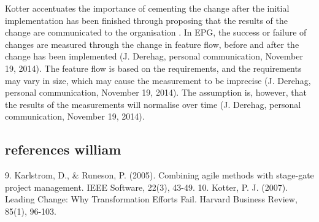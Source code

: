 \documentclass[final_report_innit.tex]{subfiles}
\begin{document}
Kotter accentuates the importance of cementing the change after the initial implementation has been finished through proposing that the results of the change are communicated to the organisation \cite{kotter1995leading}. In EPG, the success or failure of changes are measured through the change in feature flow, before and after the change has been implemented (J. Derehag, personal communication, November 19, 2014). The feature flow is based on the requirements, and the requirements may vary in size, which may cause the measurement to be imprecise (J. Derehag, personal communication, November 19, 2014). The assumption is, however, that the results of the measurements will normalise over time (J. Derehag, personal communication, November 19, 2014).   


\subsection*{references william}



9. Karlstrom, D., \& Runeson, P. (2005). Combining agile methods with stage-gate project management. IEEE Software, 22(3), 43-49.
10. Kotter, P. J. (2007). Leading Change: Why Transformation Efforts Fail. Harvard Business Review, 85(1), 96-103.
\end{document}
